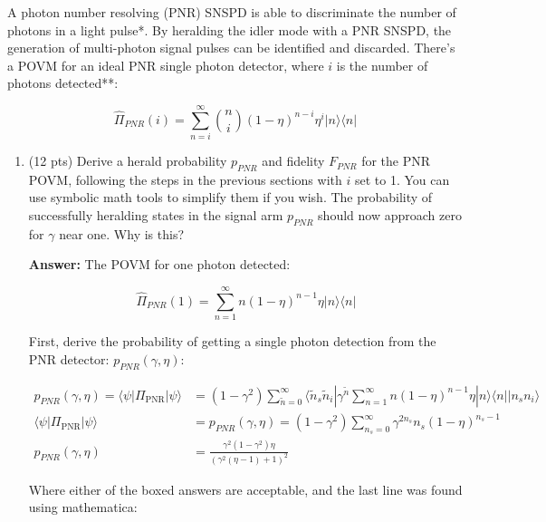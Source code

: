 \documentclass[12pt]{caltech_thesis}
\begin{document}
A photon number resolving (PNR) SNSPD is able to discriminate the number
of photons in a light pulse*. By heralding the idler mode with a PNR
SNSPD, the generation of multi-photon signal pulses can be identified
and discarded. There's a POVM for an ideal PNR single photon detector,
where \(i\) is the number of photons detected**:

\[\hat{\Pi}_{PNR}(i)=\sum_{n=i}^{\infty}\binom{n}{i}(1-\eta)^{n-i} \eta^{i}|n\rangle\langle n|\]

\begin{enumerate}
\def\labelenumi{\arabic{enumi}.}
\setcounter{enumi}{3}
\item
  (12 pts) Derive a herald probability \(p_{PNR}\) and fidelity
  \(F_{PNR}\) for the PNR POVM, following the steps in the previous
  sections with \(i\) set to 1. You can use symbolic math tools to
  simplify them if you wish. The probability of successfully heralding
  states in the signal arm \(p_{PNR}\) should now approach zero for
  \(\gamma\) near one. Why is this?

  {\color{midnightblue}  \textbf{Answer:} } {\color{midnightblue} The
  POVM for one photon detected:}

  {\color{midnightblue} 

  \[\hat{\Pi}_{PNR}(1)=\sum_{n=1}^{\infty}n(1-\eta)^{n-1} \eta|n\rangle\langle n|\]

  }

  {\color{midnightblue} First, derive the probability of getting a
  single photon detection from the PNR detector:
  \(p_{PNR}(\gamma, \eta)\):}

  {\color{midnightblue} 

  \[\begin{aligned}
       p_{PNR}(\gamma, \eta) =\langle \psi | \Pi_{\text {PNR}} | \psi \rangle &= (1- \gamma^2) \sum_{\tilde{n}=0}^{\infty} \langle \tilde{n}_s \tilde{n}_i | \gamma^{\tilde{n}} \sum_{n=1}^{\infty}n(1-\eta)^{n-1} \eta|n\rangle\langle n| | n_s n_i \rangle \\
       \langle \psi | \Pi_{\text {PNR}} | \psi \rangle &= p_{PNR}\left(\gamma, \eta\right) =  \boxed{(1-\gamma^2) \sum_{n_s=0}^{\infty} \gamma^{2n_s} n_s(1-\eta)^{n_s-1}}\\
       p_{PNR}\left(\gamma, \eta\right) &=  \boxed{\frac{\gamma ^2 (1 - \gamma ^2) \eta }{(\gamma ^2 (\eta -1)+1)^2}}
   \end{aligned}\]

  }

  {\color{midnightblue} Where either of the boxed answers are
  acceptable, and the last line was found using mathematica:}


\end{enumerate}
\end{document}
